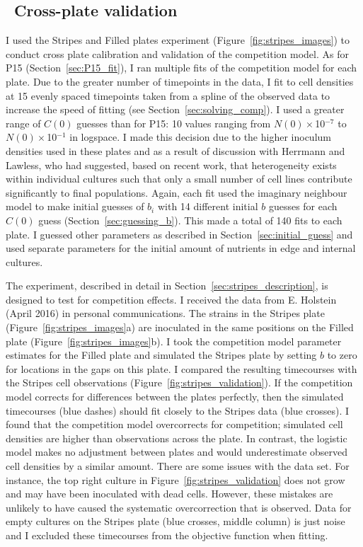 \begin{multicols}{2}

\subsection{\thesubsection~Cross-plate validation}

I used the Stripes and Filled plates experiment
(Figure~\ref{fig:stripes_images}) to conduct cross plate calibration
and validation of the competition model. As for P15
(Section~\ref{sec:P15_fit}), I ran multiple fits of the competition
model for each plate. Due to the greater number of timepoints in the
data, I fit to cell densities at 15 evenly spaced timepoints taken
from a spline of the observed data to increase the speed of fitting
(see Section~\ref{sec:solving_comp}). I used a greater range of
\(C(0)\) guesses than for P15: 10 values ranging from
\(N(0)\times\)10\(^{-7}\) to \(N(0)\times\)10\(^{-1}\) in logspace. I
made this decision due to the higher inoculum densities used in these
plates and as a result of discussion with Herrmann and Lawless, who
had suggested, based on recent work, that heterogeneity exists within
individual cultures such that only a small number of cell lines
contribute significantly to final populations. Again, each fit used
the imaginary neighbour model to make initial guesses of \(b_{i}\)
with 14 different initial \(b\) guesses for each \(C(0)\) guess
(Section~\ref{sec:guessing_b}). This made a total of 140 fits to each
plate. I guessed other parameters as described in
Section~\ref{sec:initial_guess} and used separate parameters for the
initial amount of nutrients in edge and internal cultures.

The experiment, described in detail in
Section~\ref{sec:stripes_description}, is designed to test for
competition effects. I received the data from E. Holstein (April 2016)
in personal communications. The strains in the Stripes plate
(Figure~\ref{fig:stripes_images}a) are inoculated in the same
positions on the Filled plate (Figure~\ref{fig:stripes_images}b). I
took the competition model parameter estimates for the Filled plate
and simulated the Stripes plate by setting \(b\) to zero for locations
in the gaps on this plate. I compared the resulting timecourses with
the Stripes cell observations
(Figure~\ref{fig:stripes_validation}). If the competition model
corrects for differences between the plates perfectly, then the
simulated timecourses (blue dashes) should fit closely to the Stripes
data (blue crosses). I found that the competition model overcorrects
for competition; simulated cell densities are higher than observations
across the plate. In contrast, the logistic model makes no adjustment
between plates and would underestimate observed cell densities by a
similar amount. There are some issues with the data set. For instance,
the top right culture in Figure~\ref{fig:stripes_validation} does not
grow and may have been inoculated with dead cells. However, these
mistakes are unlikely to have caused the systematic overcorrection
that is observed. Data for empty cultures on the Stripes plate (blue
crosses, middle column) is just noise and I excluded these timecourses
from the objective function when fitting.


\end{multicols}

